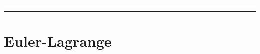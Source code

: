 








\tableofcontents			%

\begin{center}
    \rule[0mm]{150mm}{0.1mm}		%
\end{center}


\begin{abstract}		%
    
\end{abstract}

\begin{center}
    \rule[0mm]{150mm}{0.1mm}
\end{center}

\section{Euler-Lagrange}



